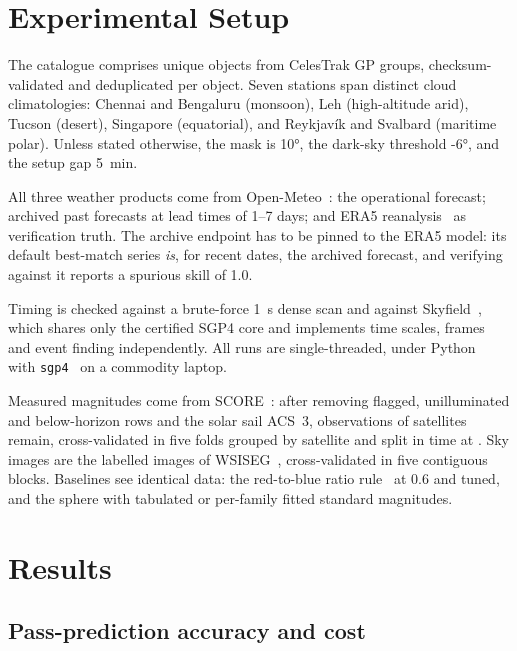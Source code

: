 \documentclass[conference]{IEEEtran}
\begin{document}
\section{Experimental Setup}
\label{sec:setup}

The catalogue comprises \NCatalogue{} unique objects from CelesTrak GP groups,
checksum-validated and deduplicated per object. Seven stations span distinct
cloud climatologies: Chennai and Bengaluru (monsoon), Leh (high-altitude arid),
Tucson (desert), Singapore (equatorial), and Reykjav\'ik and Svalbard (maritime
polar). Unless stated otherwise, the mask is \ang{10}, the dark-sky threshold
\ang{-6}, and the setup gap \SI{5}{\minute}.

All three weather products come from Open-Meteo~\cite{openmeteo}: the
operational forecast; archived past forecasts
at lead times of 1--7 days; and ERA5 reanalysis~\cite{hersbach2020era5} as
verification truth. The archive endpoint has to be pinned to the ERA5 model:
its default best-match series \emph{is}, for recent dates, the archived
forecast, and verifying against it reports a spurious skill of 1.0.

Timing is checked against a brute-force \SI{1}{\second} dense scan and against
Skyfield~\cite{skyfield}, which shares only the certified SGP4 core and
implements time scales, frames and event finding independently. All runs are
single-threaded, under Python~\PythonVersion{} with \texttt{sgp4}~\SgpVersion{}
on a commodity laptop.

Measured magnitudes come from SCORE~\cite{score2026}: after removing flagged,
unilluminated and below-horizon rows and the solar sail ACS~3, \BrightObs{}
observations of \BrightSats{} satellites remain, cross-validated in five folds
grouped by satellite and split in time at \BrightSplitDate. Sky images are the
\CamImages{} labelled images of WSISEG~\cite{xie2020segcloud}, cross-validated in
five contiguous blocks. Baselines see identical data: the red-to-blue ratio
rule~\cite{long2006retrieving} at 0.6 and tuned, and the sphere with tabulated or
per-family fitted standard magnitudes.

\section{Results}

\subsection{Pass-prediction accuracy and cost}
\label{sec:accuracy}
\end{document}
